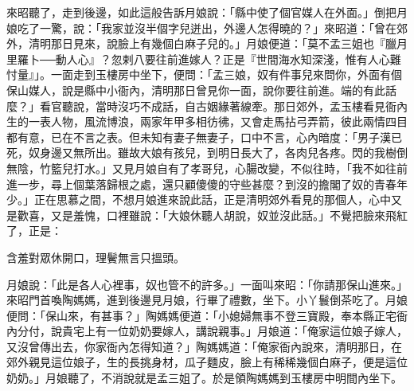 來昭聽了，走到後邊，如此這般告訴月娘說：「縣中使了個官媒人在外面。」倒把月娘吃了一驚，說：「我家並沒半個字兒迸出，外邊人怎得曉的？」來昭道：「曾在郊外，清明那日見來，說臉上有幾個白麻子兒的。」月娘便道：「莫不孟三姐也『臘月里羅卜──動人心』？忽剌八要往前進嫁人？正是『世間海水知深淺，惟有人心難忖量』」。一面走到玉樓房中坐下，便問：「孟三娘，奴有件事兒來問你，外面有個保山媒人，說是縣中小衙內，清明那日曾見你一面，說你要往前進。端的有此話麼？」看官聽說，當時沒巧不成話，自古姻緣著線牽。那日郊外，孟玉樓看見衙內生的一表人物，風流博浪，兩家年甲多相彷彿，又會走馬拈弓弄箭，彼此兩情四目都有意，已在不言之表。但未知有妻子無妻子，口中不言，心內暗度：「男子漢已死，奴身邊又無所出。雖故大娘有孩兒，到明日長大了，各肉兒各疼。閃的我樹倒無陰，竹籃兒打水。」又見月娘自有了孝哥兒，心腸改變，不似往時，「我不如往前進一步，尋上個葉落歸根之處，還只顧傻傻的守些甚麼？到沒的擔閣了奴的青春年少。」正在思慕之間，不想月娘進來說此話，正是清明郊外看見的那個人，心中又是歡喜，又是羞愧，口裡雖說：「大娘休聽人胡說，奴並沒此話。」不覺把臉來飛紅了，正是：

含羞對眾休開口，理鬢無言只搵頭。

月娘說：「此是各人心裡事，奴也管不的許多。」一面叫來昭：「你請那保山進來。」來昭門首喚陶媽媽，進到後邊見月娘，行畢了禮數，坐下。小丫鬟倒茶吃了。月娘便問：「保山來，有甚事？」陶媽媽便道：「小媳婦無事不登三寶殿，奉本縣正宅衙內分付，說貴宅上有一位奶奶要嫁人，講說親事。」月娘道：「俺家這位娘子嫁人，又沒曾傳出去，你家衙內怎得知道？」陶媽媽道：「俺家衙內說來，清明那日，在郊外親見這位娘子，生的長挑身材，瓜子麵皮，臉上有稀稀幾個白麻子，便是這位奶奶。」月娘聽了，不消說就是孟三姐了。於是領陶媽媽到玉樓房中明間內坐下。

